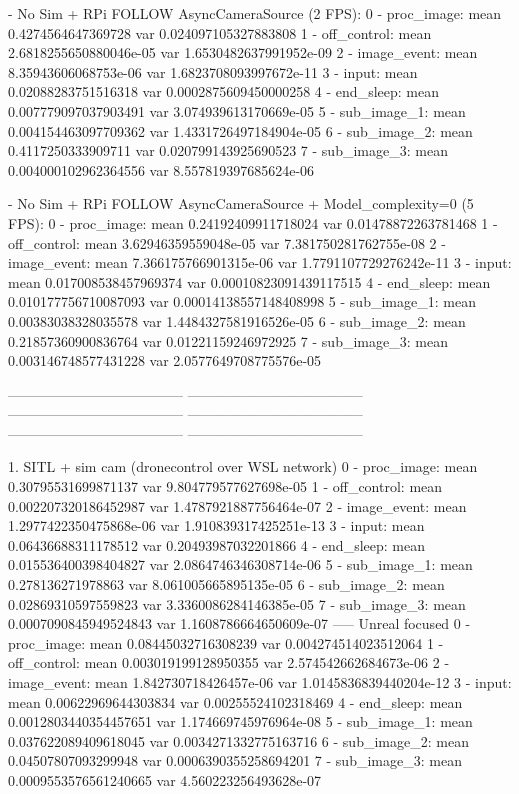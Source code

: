 - No Sim + RPi FOLLOW AsyncCameraSource (2 FPS):
0 - proc_image: mean 0.4274564647369728 var 0.024097105327883808
1 - off_control: mean 2.6818255650880046e-05 var 1.6530482637991952e-09
2 - image_event: mean 8.35943606068753e-06 var 1.6823708093997672e-11
3 - input: mean 0.02088283751516318 var 0.0002875609450000258
4 - end_sleep: mean 0.007779097037903491 var 3.074939613170669e-05
5 - sub_image_1: mean 0.004154463097709362 var 1.4331726497184904e-05
6 - sub_image_2: mean 0.4117250333909711 var 0.020799143925690523
7 - sub_image_3: mean 0.004000102962364556 var 8.557819397685624e-06

- No Sim + RPi FOLLOW AsyncCameraSource + Model_complexity=0 (5 FPS):
0 - proc_image: mean 0.24192409911718024 var 0.01478872263781468
1 - off_control: mean 3.62946359559048e-05 var 7.381750281762755e-08
2 - image_event: mean 7.366175766901315e-06 var 1.7791107729276242e-11
3 - input: mean 0.017008538457969374 var 0.00010823091439117515
4 - end_sleep: mean 0.010177756710087093 var 0.00014138557148408998
5 - sub_image_1: mean 0.00383038328035578 var 1.4484327581916526e-05
6 - sub_image_2: mean 0.21857360900836764 var 0.01221159246972925
7 - sub_image_3: mean 0.003146748577431228 var 2.0577649708775576e-05





--------------------------------------
--------------------------------------
--------------------------------------
--------------------------------------
--------------------------------------
--------------------------------------


1. SITL + sim cam  (dronecontrol over WSL network)
0 - proc_image: mean 0.30795531699871137 var 9.804779577627698e-05
1 - off_control: mean 0.002207320186452987 var 1.4787921887756464e-07
2 - image_event: mean 1.2977422350475868e-06 var 1.910839317425251e-13
3 - input: mean 0.06436688311178512 var 0.20493987032201866
4 - end_sleep: mean 0.015536400398404827 var 2.0864746346308714e-06
5 - sub_image_1: mean 0.278136271978863 var 8.061005665895135e-05
6 - sub_image_2: mean 0.02869310597559823 var 3.3360086284146385e-05
7 - sub_image_3: mean 0.0007090845949524843 var 1.1608786664650609e-07
----- Unreal focused
0 - proc_image: mean 0.08445032716308239 var 0.004274514023512064
1 - off_control: mean 0.003019199128950355 var 2.574542662684673e-06
2 - image_event: mean 1.842730718426457e-06 var 1.0145836839440204e-12
3 - input: mean 0.00622969644303834 var 0.00255524102318469
4 - end_sleep: mean 0.0012803440354457651 var 1.174669745976964e-08
5 - sub_image_1: mean 0.037622089409618045 var 0.0034271332775163716
6 - sub_image_2: mean 0.04507807093299948 var 0.0006390355258694201
7 - sub_image_3: mean 0.0009553576561240665 var 4.560223256493628e-07

